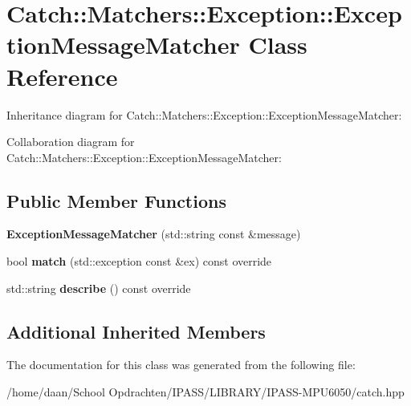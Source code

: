 \hypertarget{classCatch_1_1Matchers_1_1Exception_1_1ExceptionMessageMatcher}{}\section{Catch\+:\+:Matchers\+:\+:Exception\+:\+:Exception\+Message\+Matcher Class Reference}
\label{classCatch_1_1Matchers_1_1Exception_1_1ExceptionMessageMatcher}


Inheritance diagram for Catch\+:\+:Matchers\+:\+:Exception\+:\+:Exception\+Message\+Matcher\+:


Collaboration diagram for Catch\+:\+:Matchers\+:\+:Exception\+:\+:Exception\+Message\+Matcher\+:
\subsection*{Public Member Functions}
\begin{DoxyCompactItemize}
\item 
\mbox{\label{classCatch_1_1Matchers_1_1Exception_1_1ExceptionMessageMatcher_ace55942f39ba653db3fd69d6d90e188f}} 
{\bfseries Exception\+Message\+Matcher} (std\+::string const \&message)
\item 
\mbox{\label{classCatch_1_1Matchers_1_1Exception_1_1ExceptionMessageMatcher_aa0566d24990d69e96495360b8f79593d}} 
bool {\bfseries match} (std\+::exception const \&ex) const override
\item 
\mbox{\label{classCatch_1_1Matchers_1_1Exception_1_1ExceptionMessageMatcher_a3543441985ec877a781e660a403b1bae}} 
std\+::string {\bfseries describe} () const override
\end{DoxyCompactItemize}
\subsection*{Additional Inherited Members}


The documentation for this class was generated from the following file\+:\begin{DoxyCompactItemize}
\item 
/home/daan/\+School Opdrachten/\+I\+P\+A\+S\+S/\+L\+I\+B\+R\+A\+R\+Y/\+I\+P\+A\+S\+S-\/\+M\+P\+U6050/catch.\+hpp\end{DoxyCompactItemize}
